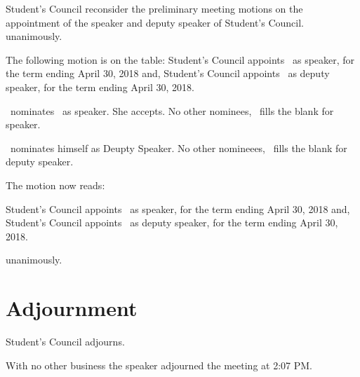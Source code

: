 \documentclass[12pt, letterpaper]{article}
\begin{document}
\begin{motion}
    \birt Student's Council reconsider the preliminary meeting motions on
    the appointment of the speaker and deputy speaker of Student's Council.
    \movers{\seneca}{\ben}
    \carries unanimously. 

    The following motion is on the table: 
    \birt Student's Council appoints \blank\ as speaker, for the term 
    ending April 30, 2018 and,
    \bifrt Student's Council appoints \blank\ as deputy speaker, for the term
    ending April 30, 2018.

    \seneca\ nominates \elizabeth\ as speaker. She accepts. 
    No other nominees, \elizabeth\ fills the blank for speaker. 

    \seneca\ nominates himself as Deupty Speaker. No other nomineees, 
    \seneca\ fills the blank for deputy speaker. 

    The motion now reads: 

    \birt Student's Council appoints \elizabeth\ as speaker, for the term 
    ending April 30, 2018 and,
    \bifrt Student's Council appoints \seneca\ as deputy speaker, for the term
    ending April 30, 2018.

    \carries unanimously.

\end{motion}

\section*{Adjournment}

\begin{motion}
    \birt Student's Council adjourns.
    
    With no other business the speaker adjourned the meeting at 2:07 PM. 
\end{motion}

\newpage


\newpage

\newpage

\newpage

\newpage

\end{document}
